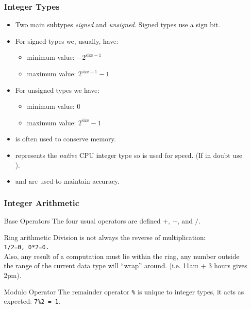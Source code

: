 \documentclass[smaller,handout,table]{beamer}
\begin{document}
\begin{frame}
\frametitle{Integer Types}
\begin{itemize}
\item Two main subtypes \emph{signed} and \emph{unsigned}. Signed types use a sign bit.
\item For signed types we, usually, have:
\begin{itemize}
\item minimum value: $-2^{\textrm{size}-1}$
\item maximum value: $2^{\textrm{size}-1}-1$
\end{itemize}
\item For unsigned types we have:
\begin{itemize}
\item minimum value: $0$
\item maximum value: $2^{\textrm{size}}-1$
\end{itemize}
\item {} is often used to conserve memory.
\item {} represents the \emph{native} CPU integer type so is used for speed. (If in doubt use ).
\item {} and  are used to maintain accuracy.
\end{itemize}
\end{frame}

\begin{frame}
\frametitle{Integer Arithmetic}

\begin{block}{Base Operators}
The four usual operators are defined $+$, $-$, {\tt *} and $/$.
\end{block}

\begin{block}{Ring arithmetic}
Division is not always the reverse of multiplication:\\
{\tt 1/2=0,  0*2=0.}\\
Also, any result of a computation must lie within the ring, any number outside the range of the current data type will ``wrap'' around. (i.e. 11am + 3 hours gives 2pm).
\end{block}

\begin{block}{Modulo Operator}
The remainder operator {\tt\%} is unique to integer types, it acts as expected:
{\tt7\%2 = 1}.
\end{block}
\end{frame}
\end{document}
